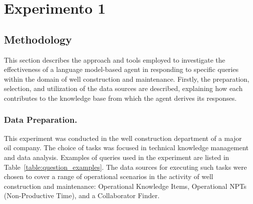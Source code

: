 
\chapter{Experimento 1}
    

    \section{Methodology}

            This section describes the approach and tools employed to investigate the effectiveness of a language model-based agent in responding to specific queries within the domain of well construction and maintenance. 
            Firstly, the preparation, selection, and utilization of the data sources are described, explaining how each contributes to the knowledge base from which the agent derives its responses. 


        \vspace{5mm}
        \subsection{Data Preparation.} 

            This experiment was conducted in the well construction department of a major oil company. The choice of tasks was focused in technical knowledge management and data analysis. Examples of queries used in the experiment are listed in Table~\ref{table:question_examples}.        
            The data sources for executing such tasks were chosen to cover a range of operational scenarios in the activity of well construction and maintenance: Operational Knowledge Items, Operational NPTs (Non-Productive Time), and a Collaborator Finder. 

